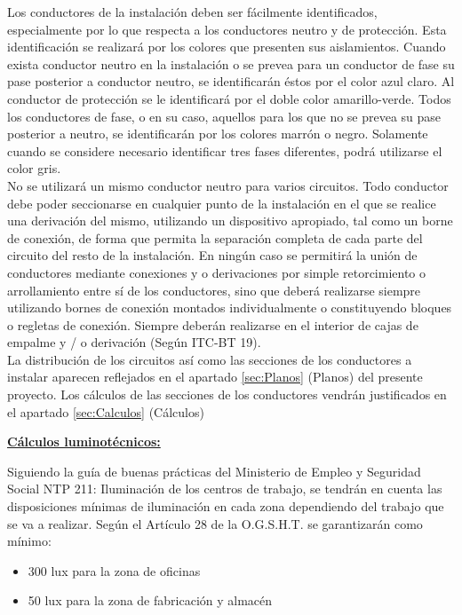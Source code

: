 Los conductores de la instalación deben ser fácilmente identificados, especialmente por lo que respecta a los conductores neutro y de protección. Esta identificación se realizará por los colores que presenten sus aislamientos. Cuando exista conductor neutro en la instalación o se prevea para un conductor de fase su pase posterior a conductor neutro, se identificarán éstos por el color azul claro. Al conductor de protección se le identificará por el doble color amarillo-verde. Todos los conductores de fase, o en su caso, aquellos para los que no se prevea su pase posterior a neutro, se identificarán por los colores marrón o negro. Solamente cuando se considere necesario identificar tres fases diferentes, podrá utilizarse el color gris.\\

No se utilizará un mismo conductor neutro para varios circuitos. Todo conductor debe poder seccionarse en cualquier punto de la instalación en el que se realice una derivación del mismo, utilizando un dispositivo apropiado, tal como un borne de conexión, de forma que permita la separación completa de cada parte del circuito del resto de la instalación. En ningún caso se permitirá la unión de conductores mediante conexiones y o derivaciones por simple retorcimiento o arrollamiento entre sí de los conductores, sino que deberá realizarse siempre utilizando bornes de conexión montados individualmente o constituyendo bloques o regletas de conexión. Siempre deberán realizarse en el interior de cajas de empalme y / o derivación (Según ITC-BT 19).\\

La distribución de los circuitos así como las secciones de los conductores a instalar aparecen reflejados en el apartado \ref{sec:Planos} (Planos) del presente proyecto. Los cálculos de las secciones de los conductores vendrán justificados en el apartado \ref{sec:Calculos} (Cálculos)\pagebreak

\underline{\bfseries Cálculos luminotécnicos:}

Siguiendo la guía de buenas prácticas del Ministerio de Empleo y Seguridad Social NTP 211: Iluminación de los centros de trabajo, se tendrán en cuenta las disposiciones mínimas de iluminación en cada zona dependiendo del trabajo que se va a realizar. Según el Artículo 28 de la O.G.S.H.T. se garantizarán como mínimo:

\begin{itemize}

\item 300 lux para la zona de oficinas 

\item 50 lux para la zona de fabricación y almacén

\end{itemize}


